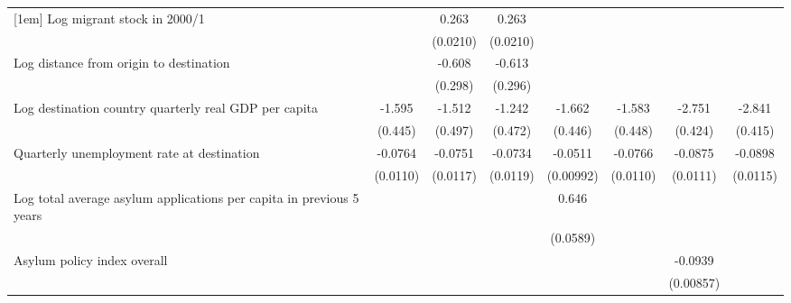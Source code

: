 \begin{table}[htbp]
\begin{tabular}{l*{7}{c}}
[1em]
Log migrant stock in 2000/1&                     &       0.263\sym{***}&       0.263\sym{***}&                     &                     &                     &                     \\
                    &                     &    (0.0210)         &    (0.0210)         &                     &                     &                     &                     \\
[1em]
Log distance from origin to destination&                     &      -0.608\sym{*}  &      -0.613\sym{*}  &                     &                     &                     &                     \\
                    &                     &     (0.298)         &     (0.296)         &                     &                     &                     &                     \\
[1em]
Log destination country quarterly real GDP per capita&      -1.595\sym{***}&      -1.512\sym{**} &      -1.242\sym{*}  &      -1.662\sym{***}&      -1.583\sym{***}&      -2.751\sym{***}&      -2.841\sym{***}\\
                    &     (0.445)         &     (0.497)         &     (0.472)         &     (0.446)         &     (0.448)         &     (0.424)         &     (0.415)         \\
[1em]
Quarterly unemployment rate at destination&     -0.0764\sym{***}&     -0.0751\sym{***}&     -0.0734\sym{***}&     -0.0511\sym{***}&     -0.0766\sym{***}&     -0.0875\sym{***}&     -0.0898\sym{***}\\
                    &    (0.0110)         &    (0.0117)         &    (0.0119)         &   (0.00992)         &    (0.0110)         &    (0.0111)         &    (0.0115)         \\
[1em]
Log total average asylum applications per capita in previous 5 years&                     &                     &                     &       0.646\sym{***}&                     &                     &                     \\
                    &                     &                     &                     &    (0.0589)         &                     &                     &                     \\
[1em]
Asylum policy index overall&                     &                     &                     &                     &                     &     -0.0939\sym{***}&                     \\
                    &                     &                     &                     &                     &                     &   (0.00857)         &                     \\

\end{tabular}
\end{table}
